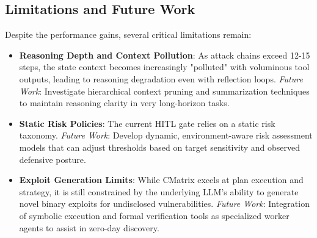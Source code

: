 \subsection{Limitations and Future Work}
Despite the performance gains, several critical limitations remain:
\begin{itemize}
    \item \textbf{Reasoning Depth and Context Pollution}: As attack chains exceed 12-15 steps, the state context becomes increasingly "polluted" with voluminous tool outputs, leading to reasoning degradation even with reflection loops. \textit{Future Work}: Investigate hierarchical context pruning and summarization techniques to maintain reasoning clarity in very long-horizon tasks.
    \item \textbf{Static Risk Policies}: The current HITL gate relies on a static risk taxonomy. \textit{Future Work}: Develop dynamic, environment-aware risk assessment models that can adjust thresholds based on target sensitivity and observed defensive posture.
    \item \textbf{Exploit Generation Limits}: While CMatrix excels at plan execution and strategy, it is still constrained by the underlying LLM's ability to generate novel binary exploits for undisclosed vulnerabilities. \textit{Future Work}: Integration of symbolic execution and formal verification tools as specialized worker agents to assist in zero-day discovery.
\end{itemize}
